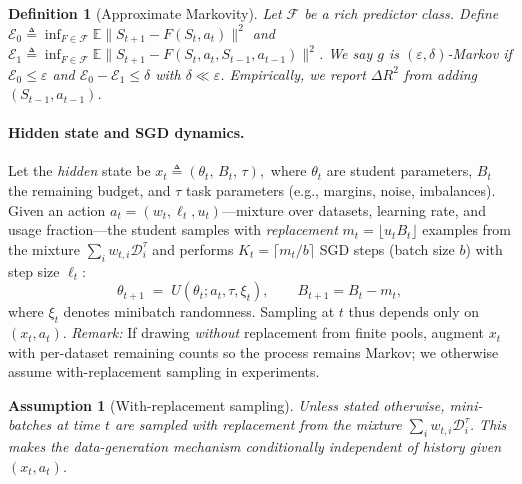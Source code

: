 \documentclass[11pt]{article}
\newtheorem{definition}{Definition}
\newtheorem{assumption}{Assumption}
\newcommand{\E}{\mathbb{E}}
\newcommand{\1}{\mathbf{1}}
\begin{document}
\begin{definition}[Approximate Markovity]
\label{def:approx-markov-tight}
Let $\mathcal{F}$ be a rich predictor class. Define
$\mathcal{E}_0 \triangleq \inf_{F\in\mathcal{F}} \E\| S_{t+1} - F(S_t,a_t)\|^2$
and
$\mathcal{E}_1 \triangleq \inf_{F\in\mathcal{F}} \E\| S_{t+1} - F(S_t,a_t,S_{t-1},a_{t-1})\|^2$.
We say $g$ is $(\varepsilon,\delta)$-Markov if $\mathcal{E}_0 \le \varepsilon$ and
$\mathcal{E}_0 - \mathcal{E}_1 \le \delta$ with $\delta \ll \varepsilon$.
Empirically, we report $\Delta R^2$ from adding $(S_{t-1},a_{t-1})$.
\end{definition}

\paragraph{Hidden state and SGD dynamics.}
Let the \emph{hidden} state be
\(
x_t \triangleq (\theta_t,\,B_t,\,\tau),
\)
where $\theta_t$ are student parameters, $B_t$ the remaining budget, and $\tau$ task parameters (e.g., margins, noise, imbalances).
Given an action $a_t=(w_t,\ell_t,u_t)$---mixture over datasets, learning rate, and usage fraction---the student samples with \emph{replacement} $m_t=\lfloor u_t B_t\rfloor$ examples from the mixture $\sum_i w_{t,i}\mathcal{D}_i^\tau$ and performs $K_t=\lceil m_t/b\rceil$ SGD steps (batch size $b$) with step size $\ell_t$:
\begin{equation}
\theta_{t+1} \;=\; U(\theta_t; a_t, \tau, \xi_t),\qquad B_{t+1}=B_t-m_t,
\end{equation}
where $\xi_t$ denotes minibatch randomness.
Sampling at $t$ thus depends only on $(x_t,a_t)$.
\textit{Remark:} If drawing \emph{without} replacement from finite pools, augment $x_t$ with per-dataset remaining counts so the process remains Markov; we otherwise assume with-replacement sampling in experiments.
\begin{assumption}[With-replacement sampling]\label{assump:with-repl}
Unless stated otherwise, mini-batches at time $t$ are sampled \emph{with replacement} from the mixture $\sum_i w_{t,i}\mathcal{D}_i^\tau$. This makes the data-generation mechanism conditionally independent of history given $(x_t,a_t)$.
\end{assumption}
\end{document}
